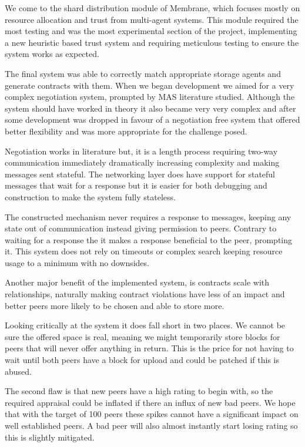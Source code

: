 \documentclass[11pt, a4paper, twoside]{report}
\begin{document}
We come to the shard distribution module of Membrane, which focuses mostly on resource allocation and trust from multi-agent systems. This module required the most testing and was the most experimental section of the project, implementing a new heuristic based trust system and requiring meticulous testing to ensure the system works as expected.

The final system was able to correctly match appropriate storage agents and generate contracts with them. When we began development we aimed for a very complex negotiation system, prompted by MAS literature studied. Although the system should have worked in theory it also became very very complex and after some development was dropped in favour of a negotiation free system that offered better flexibility and was more appropriate for the challenge posed.

Negotiation works in literature but, it is a length process requiring two-way communication immediately dramatically increasing complexity and making messages sent stateful. The networking layer does have support for stateful messages that wait for a response but it is easier for both debugging and construction to make the system fully stateless.

The constructed mechanism never requires a response to messages, keeping any state out of communication instead giving permission to peers. Contrary to waiting for a response the it makes a response beneficial to the peer, prompting it. This system does not rely on timeouts or complex search keeping resource usage to a minimum with no downsides.

Another major benefit of the implemented system, is contracts scale with relationships, naturally making contract violations have less of an impact and better peers more likely to be chosen and able to store more.

Looking critically at the system it does fall short in two places. We cannot be sure the  offered space is real, meaning we might temporarily store blocks for peers that will never offer anything in return. This is the price for not having to wait until both peers have a block for upload and could be patched if this is abused.

The second flaw is that new peers have a high rating to begin with, so the required appraisal could be inflated if there an influx of new bad peers. We hope that with the target of 100 peers these spikes cannot have a significant impact on well established peers. A bad peer will also almost instantly start losing rating so this is slightly mitigated.
\end{document}
